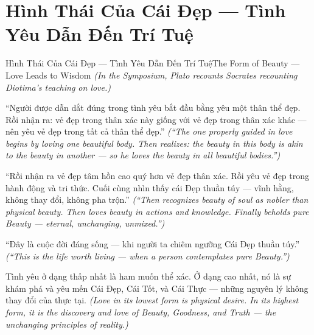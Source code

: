 \section{Hình Thái Của Cái Đẹp — Tình Yêu Dẫn Đến Trí Tuệ}
\begin{truyen}{Hình Thái Của Cái Đẹp — Tình Yêu Dẫn Đến Trí Tuệ}{The Form of Beauty — Love Leads to Wisdom}
\textit{(In the Symposium, Plato recounts Socrates recounting Diotima's teaching on love.)}

``Người được dẫn dắt đúng trong tình yêu bắt đầu bằng yêu một thân thể đẹp. Rồi nhận ra: vẻ đẹp trong thân xác này giống với vẻ đẹp trong thân xác khác — nên yêu vẻ đẹp trong tất cả thân thể đẹp.''
\textit{(``The one properly guided in love begins by loving one beautiful body. Then realizes: the beauty in this body is akin to the beauty in another — so he loves the beauty in all beautiful bodies.'')}

``Rồi nhận ra vẻ đẹp tâm hồn cao quý hơn vẻ đẹp thân xác. Rồi yêu vẻ đẹp trong hành động và tri thức. Cuối cùng nhìn thấy cái Đẹp thuần túy — vĩnh hằng, không thay đổi, không pha trộn.''
\textit{(``Then recognizes beauty of soul as nobler than physical beauty. Then loves beauty in actions and knowledge. Finally beholds pure Beauty — eternal, unchanging, unmixed.'')}

``Đây là cuộc đời đáng sống — khi người ta chiêm ngưỡng Cái Đẹp thuần túy.''
\textit{(``This is the life worth living — when a person contemplates pure Beauty.'')}

\end{truyen}

\begin{baihoc}
Tình yêu ở dạng thấp nhất là ham muốn thể xác. Ở dạng cao nhất, nó là sự khám phá và yêu mến Cái Đẹp, Cái Tốt, và Cái Thực — những nguyên lý không thay đổi của thực tại.
\textit{(Love in its lowest form is physical desire. In its highest form, it is the discovery and love of Beauty, Goodness, and Truth — the unchanging principles of reality.)}
\end{baihoc}
\ngancach

